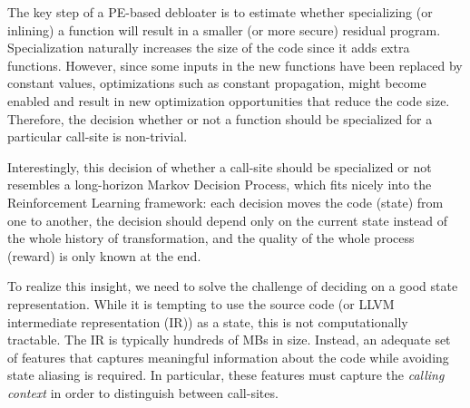 The key step of a PE-based debloater is to estimate whether specializing (or
inlining) a function will result in a smaller (or more secure) residual program.
Specialization naturally increases the size of the code since it adds extra
functions. However, since some inputs in the new functions have been replaced by
constant values, optimizations such as constant propagation, might become
enabled and result in new optimization opportunities that reduce the code size.
Therefore, the decision whether or not a function should be specialized for a
particular call-site is non-trivial. %


Interestingly, this decision of whether a call-site should be specialized or not resembles a long-horizon Markov Decision Process, which fits nicely into the Reinforcement Learning framework: each decision moves the code (state) from one to another, the decision should depend only on the current state instead of the whole history of transformation, and the quality of the whole process (reward) is only known at the end. 





To realize this insight, we need to solve the challenge of deciding on a good state representation.  While it is tempting to use the source code (or LLVM
intermediate representation (IR)) as a state, this is not
computationally tractable. The IR is typically hundreds of MBs in
size. Instead, an adequate set of features that captures meaningful
information about the code while avoiding state aliasing is
required. In particular, these features must capture the \emph{calling context}
in order to distinguish between call-sites. 

